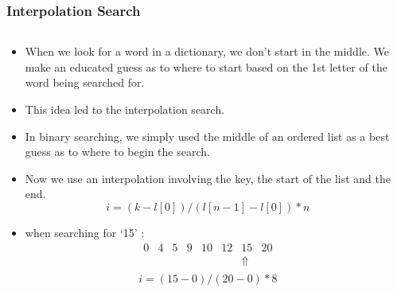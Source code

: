 
\begin{frame}[fragile]
\frametitle{Interpolation Search}
\begin{columns}[T]

\begin{column}{0.50\textwidth}
\begin{itemize}[<+->]
\item When we look for a word in a dictionary, we don't start in the middle.
We make an educated guess as to where to start based on the 1st letter of the
word being searched for.
\item This idea led to the interpolation search.
\item In binary searching, we simply used the middle of an ordered list as a best guess as to where to begin the search.
\item Now we use an interpolation involving the key, the start of the list and the end.
\[
i = (k - l[0])/(l[n-1] - l[0])*n
\]
\item when searching for `15' :
\[
\begin{array}{cccccccc}
0 & 4 & 5 & 9 & 10 & 12 & 15 & 20\\
&&&&&&\Uparrow&\\
\end{array}
\]
\[
i = (15-0)/(20-0)*8
\]
\end{itemize}
\end{column}

\pause
\begin{column}{0.40\textwidth}

\end{column}

\end{columns}
\end{frame}


